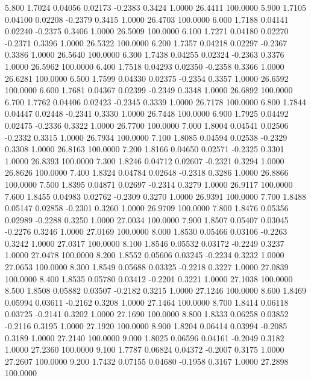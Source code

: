    5.800   1.7024   0.04056   0.02173  -0.2383   0.3424   1.0000  26.4411 100.0000
   5.900   1.7105   0.04100   0.02208  -0.2379   0.3415   1.0000  26.4703 100.0000
   6.000   1.7188   0.04141   0.02240  -0.2375   0.3406   1.0000  26.5009 100.0000
   6.100   1.7271   0.04180   0.02270  -0.2371   0.3396   1.0000  26.5322 100.0000
   6.200   1.7357   0.04218   0.02297  -0.2367   0.3386   1.0000  26.5640 100.0000
   6.300   1.7438   0.04255   0.02324  -0.2363   0.3376   1.0000  26.5962 100.0000
   6.400   1.7518   0.04293   0.02350  -0.2358   0.3366   1.0000  26.6281 100.0000
   6.500   1.7599   0.04330   0.02375  -0.2354   0.3357   1.0000  26.6592 100.0000
   6.600   1.7681   0.04367   0.02399  -0.2349   0.3348   1.0000  26.6892 100.0000
   6.700   1.7762   0.04406   0.02423  -0.2345   0.3339   1.0000  26.7178 100.0000
   6.800   1.7844   0.04447   0.02448  -0.2341   0.3330   1.0000  26.7448 100.0000
   6.900   1.7925   0.04492   0.02475  -0.2336   0.3322   1.0000  26.7700 100.0000
   7.000   1.8004   0.04541   0.02506  -0.2332   0.3315   1.0000  26.7934 100.0000
   7.100   1.8085   0.04594   0.02538  -0.2329   0.3308   1.0000  26.8163 100.0000
   7.200   1.8166   0.04650   0.02571  -0.2325   0.3301   1.0000  26.8393 100.0000
   7.300   1.8246   0.04712   0.02607  -0.2321   0.3294   1.0000  26.8626 100.0000
   7.400   1.8324   0.04784   0.02648  -0.2318   0.3286   1.0000  26.8866 100.0000
   7.500   1.8395   0.04871   0.02697  -0.2314   0.3279   1.0000  26.9117 100.0000
   7.600   1.8455   0.04983   0.02762  -0.2309   0.3270   1.0000  26.9391 100.0000
   7.700   1.8488   0.05147   0.02858  -0.2301   0.3260   1.0000  26.9709 100.0000
   7.800   1.8476   0.05356   0.02989  -0.2288   0.3250   1.0000  27.0034 100.0000
   7.900   1.8507   0.05407   0.03045  -0.2276   0.3246   1.0000  27.0169 100.0000
   8.000   1.8530   0.05466   0.03106  -0.2263   0.3242   1.0000  27.0317 100.0000
   8.100   1.8546   0.05532   0.03172  -0.2249   0.3237   1.0000  27.0478 100.0000
   8.200   1.8552   0.05606   0.03245  -0.2234   0.3232   1.0000  27.0653 100.0000
   8.300   1.8549   0.05688   0.03325  -0.2218   0.3227   1.0000  27.0839 100.0000
   8.400   1.8535   0.05780   0.03412  -0.2201   0.3221   1.0000  27.1038 100.0000
   8.500   1.8508   0.05882   0.03507  -0.2182   0.3215   1.0000  27.1246 100.0000
   8.600   1.8469   0.05994   0.03611  -0.2162   0.3208   1.0000  27.1464 100.0000
   8.700   1.8414   0.06118   0.03725  -0.2141   0.3202   1.0000  27.1690 100.0000
   8.800   1.8333   0.06258   0.03852  -0.2116   0.3195   1.0000  27.1920 100.0000
   8.900   1.8204   0.06414   0.03994  -0.2085   0.3189   1.0000  27.2140 100.0000
   9.000   1.8025   0.06596   0.04161  -0.2049   0.3182   1.0000  27.2360 100.0000
   9.100   1.7787   0.06824   0.04372  -0.2007   0.3175   1.0000  27.2607 100.0000
   9.200   1.7432   0.07155   0.04680  -0.1958   0.3167   1.0000  27.2898 100.0000
